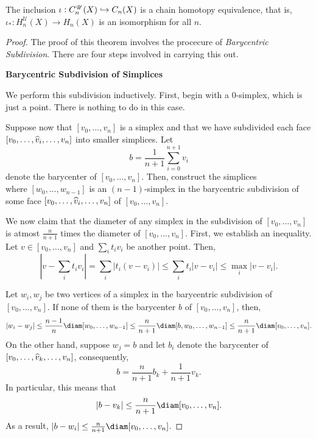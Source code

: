 \begin{theorem}
    The inclusion $\iota: C_n^{\mathscr U}(X)\hookrightarrow C_n(X)$ is a chain homotopy equivalence, that is, $\iota_\ast: H_n^{\mathscr U}(X)\to H_n(X)$ is an isomorphism for all $n$.
\end{theorem}
\begin{proof}
The proof of this theorem involves the procecure of \emph{Barycentric Subdivision}. There are four steps involved in carrying this out.

\noindent\textbf{Barycentric Subdivision of Simplices}

We perform this subdivision inductively. First, begin with a $0$-simplex, which is just a point. There is nothing to do in this case. 

Suppose now that $[v_0,\dots,v_n]$ is a simplex and that we have subdivided each face $[v_0,\dots,\widehat{v}_i,\dots, v_n]$ into smaller simplices. Let 
\begin{equation*}
    b = \frac{1}{n + 1}\sum_{i = 0}^{n + 1}v_i
\end{equation*}
denote the barycenter of $[v_0,\dots,v_n]$. Then, construct the simplices 
\begin{equation*}
    [b,w_0,\dots,w_{n - 1}]
\end{equation*}
where $[w_0,\dots,w_{n - 1}]$ is an $(n - 1)$-simplex in the barycentric subdivision of some face $[v_0,\dots,\widehat{v}_i,\dots,v_n]$ of $[v_0,\dots,v_n]$.

We now claim that the diameter of any simplex in the subdivision of $[v_0,\dots,v_n]$ is atmost $\frac{n}{n + 1}$ times the diameter of $[v_0,\dots,v_n]$. First, we establish an inequality. Let $v\in [v_0,\dots,v_n]$ and $\sum_i t_iv_i$ be another point. Then, 
\begin{equation*}
    \left|v - \sum_{i}t_iv_i\right| = \sum_{i}\left|t_i(v - v_i)\right|\le\sum_i t_i|v - v_i|\le\max_{i}|v - v_i|.
\end{equation*}

Let $w_i,w_j$ be two vertices of a simplex in the barycentric subdivision of $[v_0,\dots,v_n]$. If none of them is the barycenter $b$ of $[v_0,\dots,v_n]$, then, 
\begin{equation*}
    |w_i - w_j|\le\frac{n - 1}{n}\diam[w_0,\dots,w_{n - 1}]\le\frac{n}{n + 1}\diam[b,w_0,\dots,w_{n - 1}]\le\frac{n}{n + 1}\diam[v_0,\dots,v_n].
\end{equation*}
On the other hand, suppose $w_j = b$ and let $b_i$ denote the barycenter of $[v_0,\dots,\widehat{v}_k,\dots,v_n]$, consequently, 
\begin{equation*}
    b = \frac{n}{n + 1}b_k + \frac{1}{n + 1}v_k.
\end{equation*}
In particular, this means that 
\begin{equation*}
    |b - v_k|\le\frac{n}{n + 1}\diam[v_0,\dots,v_n].
\end{equation*}
As a result, $|b - w_i|\le\frac{n}{n + 1}\diam[v_0,\dots,v_n]$.


\end{proof}
